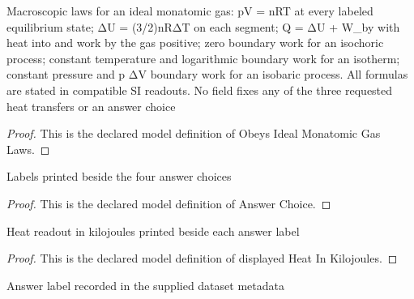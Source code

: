 \begin{definition}
  \label{def:physics:phyx-mini-0414:phyxminiproblems-problemphyxmini0414-obeysidealmonatomicgaslaws}
  Macroscopic laws for an ideal monatomic gas: pV = nRT at every labeled equilibrium state; ΔU = (3/2)nRΔT on each segment; Q = ΔU + W\_by with heat into and work by the gas positive; zero boundary work for an isochoric process; constant temperature and logarithmic boundary work for an isotherm; constant pressure and p ΔV boundary work for an isobaric process. All formulas are stated in compatible SI readouts. No field fixes any of the three requested heat transfers or an answer choice
\end{definition}
\begin{proof}
  This is the declared model definition of Obeys Ideal Monatomic Gas Laws.
\end{proof}
\begin{definition}
  \label{def:physics:phyx-mini-0414:phyxminiproblems-problemphyxmini0414-answerchoice}
  Labels printed beside the four answer choices
\end{definition}
\begin{proof}
  This is the declared model definition of Answer Choice.
\end{proof}
\begin{definition}
  \label{def:physics:phyx-mini-0414:phyxminiproblems-problemphyxmini0414-displayedheatinkilojoules}
  Heat readout in kilojoules printed beside each answer label
\end{definition}
\begin{proof}
  This is the declared model definition of displayed Heat In Kilojoules.
\end{proof}
\begin{definition}
  \label{def:physics:phyx-mini-0414:phyxminiproblems-problemphyxmini0414-recordedanswerchoice}
  Answer label recorded in the supplied dataset metadata
\end{definition}
